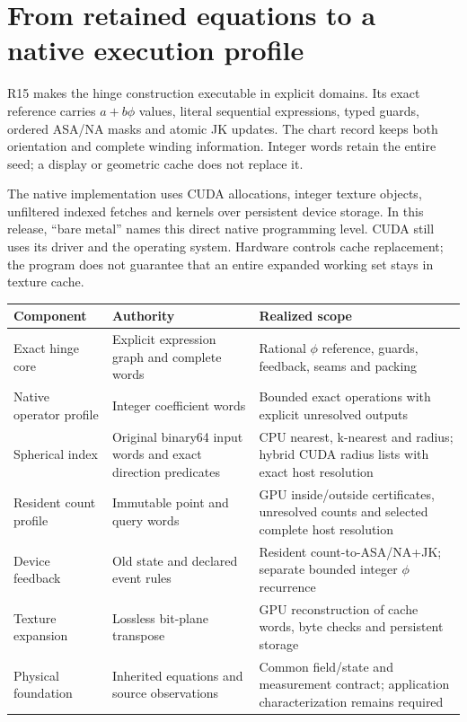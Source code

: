 \section*{From retained equations to a native execution profile}
R15 makes the hinge construction executable in explicit domains. Its exact
reference carries $a+b\phi$ values, literal sequential expressions, typed
guards, ordered ASA/NA masks and atomic JK updates. The chart record keeps
both orientation and complete winding information. Integer words retain the
entire seed; a display or geometric cache does not replace it.

The native implementation uses CUDA allocations, integer texture objects,
unfiltered indexed fetches and kernels over persistent device storage. In this
release, ``bare metal'' names this direct native programming level. CUDA still
uses its driver and the operating system. Hardware controls cache replacement;
the program does not guarantee that an entire expanded working set stays in
texture cache.

\begin{center}\small
\begin{tabularx}{\linewidth}{@{}P{32mm}Y Y@{}}
\toprule Component & Authority & Realized scope\\\midrule
Exact hinge core & Explicit expression graph and complete words & Rational $\phi$ reference, guards, feedback, seams and packing\\
Native operator profile & Integer coefficient words & Bounded exact operations with explicit unresolved outputs\\
Spherical index & Original binary64 input words and exact direction predicates & CPU nearest, k-nearest and radius; hybrid CUDA radius lists with exact host resolution\\
Resident count profile & Immutable point and query words & GPU inside/outside certificates, unresolved counts and selected complete host resolution\\
Device feedback & Old state and declared event rules & Resident count-to-ASA/NA+JK; separate bounded integer $\phi$ recurrence\\
Texture expansion & Lossless bit-plane transpose & GPU reconstruction of cache words, byte checks and persistent storage\\
Physical foundation & Inherited equations and source observations & Common field/state and measurement contract; application characterization remains required\\
\bottomrule
\end{tabularx}\end{center}

